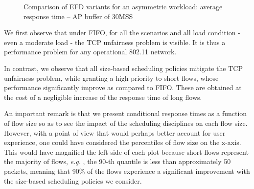 \documentclass[preprint,12pt]{elsarticle}
\begin{document}
\begin{figure}[ht!]
  \centering
  \caption{Comparison of EFD variants for an asymmetric workload: average response time --  AP buffer of 30MSS}
  \label{fig:avg_time_asym}
\end{figure}

We first observe that under FIFO, for all the scenarios and all load condition - even a moderate load - the TCP unfairness problem is visible. It is thus a performance problem for any operational 802.11 network.

In contrast, we observe that all size-based scheduling policies mitigate the TCP unfairness problem, while granting a high priority to short flows, whose performance significantly improve as compared to FIFO. These are obtained at the cost of a negligible increase of the response time of long flows. 

An important remark is that we  present conditional response times as a function of flow size so as to see the impact of the scheduling disciplines on each flow size. However, with a point of view that would perhaps better account for user experience, one could have considered the percentiles of flow size on the x-axis. This would have magnified the left side of each plot because short flows represent the majority of flows, \textit{e.g.} , the 90-th quantile is less than approximately 50 packets, meaning that 90\% of the flows experience a significant improvement with the size-based scheduling policies we consider.
\end{document}
